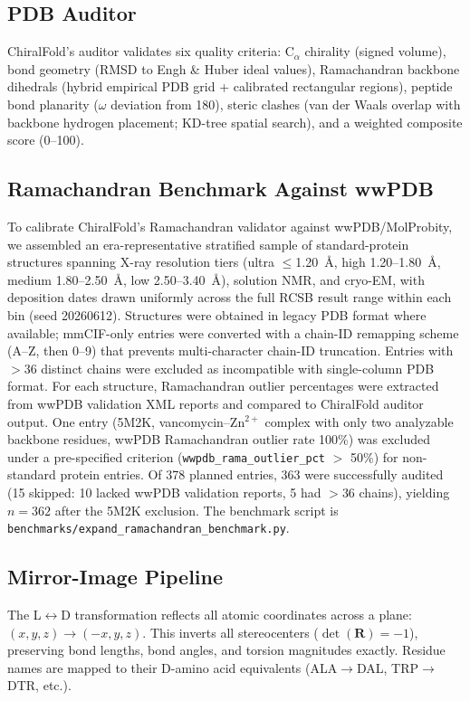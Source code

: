 \documentclass[11pt]{article}
\begin{document}
\subsection{PDB Auditor}

ChiralFold's auditor validates six quality criteria: C$_\alpha$ chirality (signed volume), bond geometry (RMSD to Engh \& Huber ideal values), Ramachandran backbone dihedrals (hybrid empirical PDB grid + calibrated rectangular regions), peptide bond planarity ($\omega$ deviation from 180\textdegree), steric clashes (van der Waals overlap with backbone hydrogen placement; KD-tree spatial search), and a weighted composite score (0--100).

\subsection{Ramachandran Benchmark Against wwPDB}

To calibrate ChiralFold's Ramachandran validator against wwPDB/MolProbity, we assembled an era-representative stratified sample of standard-protein structures spanning X-ray resolution tiers (ultra $\leq$1.20~\AA, high 1.20--1.80~\AA, medium 1.80--2.50~\AA, low 2.50--3.40~\AA), solution NMR, and cryo-EM, with deposition dates drawn uniformly across the full RCSB result range within each bin (seed 20260612). Structures were obtained in legacy PDB format where available; mmCIF-only entries were converted with a chain-ID remapping scheme (A--Z, then 0--9) that prevents multi-character chain-ID truncation. Entries with $>$36 distinct chains were excluded as incompatible with single-column PDB format. For each structure, Ramachandran outlier percentages were extracted from wwPDB validation XML reports and compared to ChiralFold auditor output. One entry (5M2K, vancomycin--Zn$^{2+}$ complex with only two analyzable backbone residues, wwPDB Ramachandran outlier rate 100\%) was excluded under a pre-specified criterion (\texttt{wwpdb\_rama\_outlier\_pct} $>$ 50\%) for non-standard protein entries. Of 378 planned entries, 363 were successfully audited (15 skipped: 10 lacked wwPDB validation reports, 5 had $>$36 chains), yielding $n=362$ after the 5M2K exclusion. The benchmark script is \texttt{benchmarks/expand\_ramachandran\_benchmark.py}.

\subsection{Mirror-Image Pipeline}

The L$\leftrightarrow$D transformation reflects all atomic coordinates across a plane: $(x,y,z) \to (-x,y,z)$. This inverts all stereocenters ($\det(\mathbf{R}) = -1$), preserving bond lengths, bond angles, and torsion magnitudes exactly. Residue names are mapped to their D-amino acid equivalents (ALA$\to$DAL, TRP$\to$DTR, etc.).
\end{document}
